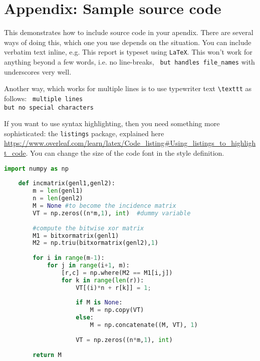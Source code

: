 \section{Appendix: Sample source code}\label{app:sample-source-code}

This demonstrates how to include source code in your apendix.  There are several ways of doing this, which one you use depends on the situation.  You can include verbatim text inline, e.g.  This report is typeset using  \verb|LaTeX|.  This won't work for anything beyond a few words, i.e. no line-breaks, \verb| but handles file_names| with underscores very well.

Another way, which works for multiple lines is to use typewriter text \verb|\texttt| as follows:
\texttt{
multiple lines \\
but no special characters }

If you want to use syntax highlighting, then you need something more sophisticated: the \verb|listings| package, explained here \url{https://www.overleaf.com/learn/latex/Code_listing#Using_listings_to_highlight_code}.  You can change the size of the code font in the style definition.


\begin{lstlisting}[language=python]
    import numpy as np
        
    def incmatrix(genl1,genl2):
        m = len(genl1)
        n = len(genl2)
        M = None #to become the incidence matrix
        VT = np.zeros((n*m,1), int)  #dummy variable
        
        #compute the bitwise xor matrix
        M1 = bitxormatrix(genl1)
        M2 = np.triu(bitxormatrix(genl2),1) 
    
        for i in range(m-1):
            for j in range(i+1, m):
                [r,c] = np.where(M2 == M1[i,j])
                for k in range(len(r)):
                    VT[(i)*n + r[k]] = 1;
                    
                    if M is None:
                        M = np.copy(VT)
                    else:
                        M = np.concatenate((M, VT), 1)
                    
                    VT = np.zeros((n*m,1), int)
        
        return M
    \end{lstlisting}